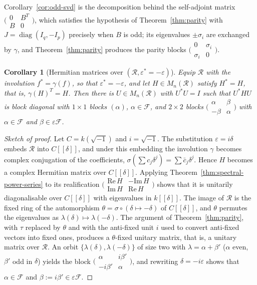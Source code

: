 \documentclass[12pt, a4paper]{report}
\theoremstyle{plain}
\newtheorem{corollary}[theorem]{Corollary}
\theoremstyle{definition}
\theoremstyle{remark}
\theoremstyle{plain}
\DeclareMathOperator{\diag}{diag}
\begin{document}
Corollary~\ref{cor:odd-svd} is the decomposition behind the self-adjoint matrix $\bigl(\begin{smallmatrix}0&B^T\\B&0\end{smallmatrix}\bigr)$, which satisfies the hypothesis of Theorem~\ref{thm:parity} with $J=\diag(I_q,-I_p)$ precisely when $B$ is odd; its eigenvalues $\pm\sigma_i$ are exchanged by $\gamma$, and Theorem~\ref{thm:parity} produces the parity blocks $\bigl(\begin{smallmatrix}0&\sigma_i\\\sigma_i&0\end{smallmatrix}\bigr)$.

\begin{corollary}[Hermitian matrices over $(\mathcal R,\varepsilon^*=-\varepsilon)$]\label{cor:twisted-hermitian}
Equip $\mathcal R$ with the involution $f^*=\gamma(f)$, so that $\varepsilon^*=-\varepsilon$, and let $H\in M_n(\mathcal R)$ satisfy $H^*=H$, that is, $\gamma(H)^T=H$. Then there is $U\in M_n(\mathcal R)$ with $U^*U=I$ such that $U^*HU$ is block diagonal with $1\times1$ blocks $(\alpha)$, $\alpha\in\mathcal F$, and $2\times2$ blocks $\bigl(\begin{smallmatrix}\alpha&\beta\\-\beta&\alpha\end{smallmatrix}\bigr)$ with $\alpha\in\mathcal F$ and $\beta\in\varepsilon\mathcal F$.
\end{corollary}
\begin{proof}[Sketch of proof]
Let $C=k(\sqrt{-1})$ and $i=\sqrt{-1}$. The substitution $\varepsilon=i\delta$ embeds $\mathcal R$ into $C[[\delta]]$, and under this embedding the involution $\gamma$ becomes complex conjugation of the coefficients, $\sigma(\sum c_j\delta^j)=\sum\bar c_j\delta^j$. Hence $H$ becomes a complex Hermitian matrix over $C[[\delta]]$. Applying Theorem~\ref{thm:spectral-power-series} to its realification $\bigl(\begin{smallmatrix}\mathrm{Re}\,H&-\mathrm{Im}\,H\\ \mathrm{Im}\,H&\mathrm{Re}\,H\end{smallmatrix}\bigr)$ shows that it is unitarily diagonalisable over $C[[\delta]]$ with eigenvalues in $k[[\delta]]$. The image of $\mathcal R$ is the fixed ring of the automorphism $\theta=\sigma\circ(\delta\mapsto-\delta)$ of $C[[\delta]]$, and $\theta$ permutes the eigenvalues as $\lambda(\delta)\mapsto\lambda(-\delta)$. The argument of Theorem~\ref{thm:parity}, with $\tau$ replaced by $\theta$ and with the anti-fixed unit $i$ used to convert anti-fixed vectors into fixed ones, produces a $\theta$-fixed unitary matrix, that is, a unitary matrix over $\mathcal R$. An orbit $\{\lambda(\delta),\lambda(-\delta)\}$ of size two with $\lambda=\alpha+\beta'$ ($\alpha$ even, $\beta'$ odd in $\delta$) yields the block $\bigl(\begin{smallmatrix}\alpha&i\beta'\\-i\beta'&\alpha\end{smallmatrix}\bigr)$, and rewriting $\delta=-i\varepsilon$ shows that $\alpha\in\mathcal F$ and $\beta:=i\beta'\in\varepsilon\mathcal F$.
\end{proof}
\end{document}
